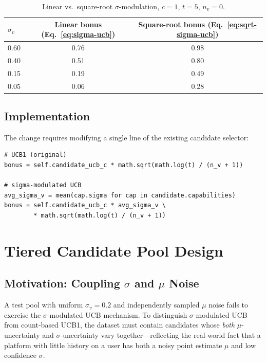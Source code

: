 \documentclass[11pt]{article}
\begin{document}
\begin{table}[h]
\centering
\small
\begin{tabular}{lcc}
\toprule
$\bar{\sigma}_v$ & Linear bonus (Eq.~\ref{eq:sigma-ucb}) & Square-root bonus (Eq.~\ref{eq:sqrt-sigma-ucb}) \\
\midrule
0.60 & 0.76 & 0.98 \\
0.40 & 0.51 & 0.80 \\
0.15 & 0.19 & 0.49 \\
0.05 & 0.06 & 0.28 \\
\bottomrule
\end{tabular}
\caption{Linear vs.\ square-root $\sigma$-modulation, $c = 1$, $t = 5$, $n_v = 0$.}
\label{tab:variants}
\end{table}

\subsection{Implementation}

The change requires modifying a single line of the existing candidate selector:

\begin{lstlisting}[style=python]
# UCB1 (original)
bonus = self.candidate_ucb_c * math.sqrt(math.log(t) / (n_v + 1))

# sigma-modulated UCB
avg_sigma_v = mean(cap.sigma for cap in candidate.capabilities)
bonus = self.candidate_ucb_c * avg_sigma_v \
        * math.sqrt(math.log(t) / (n_v + 1))
\end{lstlisting}

\section{Tiered Candidate Pool Design}
\label{sec:tiered-pool}

\subsection{Motivation: Coupling $\sigma$ and $\mu$ Noise}

A test pool with uniform $\sigma_v = 0.2$ and independently sampled $\mu$ noise
fails to exercise the $\sigma$-modulated UCB mechanism. To distinguish
$\sigma$-modulated UCB from count-based UCB1, the dataset must contain
candidates whose \emph{both} $\mu$-uncertainty and $\sigma$-uncertainty vary
together---reflecting the real-world fact that a platform with little history
on a user has both a noisy point estimate $\mu$ and low confidence $\sigma$.
\end{document}
